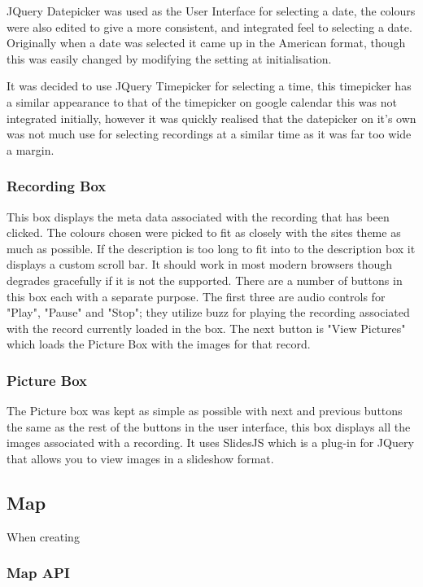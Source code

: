 \documentclass{l3proj}
\begin{document}
JQuery Datepicker was used as the User Interface for selecting a date,
the colours were also edited to give a more consistent, and integrated
feel to selecting a date. Originally when a date was selected it came
up in the American format, though this was easily changed by modifying
the setting at initialisation. 

It was decided to use JQuery Timepicker for selecting a time, this 
timepicker has a similar appearance to that of the timepicker on google 
calendar this was not integrated initially, however it was quickly 
realised that the datepicker on it's own was not much use for selecting 
recordings at a similar time as it was far too wide a margin. 

\subsubsection{Recording Box}
This box displays the meta data associated with the recording that has
been clicked. The colours chosen were picked to fit as closely with
the sites theme as much as possible. If the description is too long to
fit into to the description box it displays a custom  scroll bar. It
should work in most modern browsers though degrades gracefully if it
is not the supported. There are a number of buttons in this box each with 
a separate purpose. The first three are audio controls for "Play", 
"Pause" and "Stop"; they utilize buzz for playing the recording 
associated with the record currently loaded in the box. The next button 
is "View Pictures" which loads the Picture Box with the images for that 
record.

\subsubsection{Picture Box}
The Picture box was kept as simple as possible with next and previous
buttons the same as the rest of the buttons in the user interface,
this box displays all the images associated with a recording. It uses
SlidesJS which is a plug-in for JQuery that allows you to view images
in a slideshow format.



\subsection{Map}

When creating 

\subsubsection{Map API}
\end{document}
